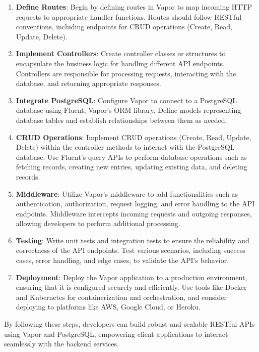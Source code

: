 \documentclass[
  biblatex,
  language=english,
  figures=false,
  sourcecodes,
  glossaries,
  index
]{kidiplom}
\begin{document}
\begin{enumerate}
    \item \textbf{Define Routes}: Begin by defining routes in Vapor to map incoming HTTP requests to appropriate handler functions. Routes should follow RESTful conventions, including endpoints for CRUD operations (Create, Read, Update, Delete).
    
    \item \textbf{Implement Controllers}: Create controller classes or structures to encapsulate the business logic for handling different API endpoints. Controllers are responsible for processing requests, interacting with the database, and returning appropriate responses.
    
    \item \textbf{Integrate PostgreSQL}: Configure Vapor to connect to a PostgreSQL database using Fluent, Vapor's ORM library. Define models representing database tables and establish relationships between them as needed.
    
    \item \textbf{CRUD Operations}: Implement CRUD operations (Create, Read, Update, Delete) within the controller methods to interact with the PostgreSQL database. Use Fluent's query APIs to perform database operations such as fetching records, creating new entries, updating existing data, and deleting records.
    
    \item \textbf{Middleware}: Utilize Vapor's middleware to add functionalities such as authentication, authorization, request logging, and error handling to the API endpoints. Middleware intercepts incoming requests and outgoing responses, allowing developers to perform additional processing.
    
    \item \textbf{Testing}: Write unit tests and integration tests to ensure the reliability and correctness of the API endpoints. Test various scenarios, including success cases, error handling, and edge cases, to validate the API's behavior.
    
    \item \textbf{Deployment}: Deploy the Vapor application to a production environment, ensuring that it is configured securely and efficiently. Use tools like Docker and Kubernetes for containerization and orchestration, and consider deploying to platforms like AWS, Google Cloud, or Heroku.
\end{enumerate}

By following these steps, developers can build robust and scalable RESTful APIs using Vapor and PostgreSQL, empowering client applications to interact seamlessly with the backend services.
\end{document}
